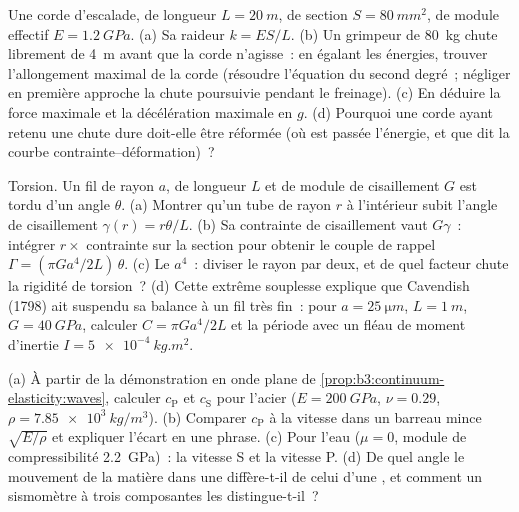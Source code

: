 \begin{exercise}[$\star\star$]\label{exo:b3:continuum-elasticity:7}
Une corde d'escalade, de longueur $L = \qty{20}{m}$, de section $S =
\qty{80}{mm^2}$, de module effectif $E = \qty{1.2}{GPa}$. (a) Sa
raideur $k = ES/L$. (b) Un grimpeur de \qty{80}{kg} chute librement de
\qty{4}{m} avant que la corde n'agisse~: en égalant les énergies,
trouver l'allongement maximal de la corde (résoudre l'équation du
second degré~; négliger en première approche la chute poursuivie
pendant le freinage). (c) En déduire la force maximale et la
décélération maximale en $g$. (d) Pourquoi une corde ayant retenu une
chute dure doit-elle être réformée (où est passée l'énergie, et que dit
la courbe contrainte--déformation)~?
\end{exercise}

\begin{exercise}[$\star\star$]\label{exo:b3:continuum-elasticity:8}
Torsion. Un fil de rayon $a$, de longueur $L$ et de module de
cisaillement $G$ est tordu d'un angle $\theta$. (a) Montrer qu'un tube
de rayon $r$ à l'intérieur subit l'angle de cisaillement
$\gamma(r) = r\theta/L$. (b) Sa contrainte de cisaillement vaut
$G\gamma$~: intégrer $r \times$ contrainte sur la section pour obtenir
le couple de rappel $\Gamma = (\pi Ga^4/2L)\,\theta$. (c) Le $a^4$~:
diviser le rayon par deux, et de quel facteur chute la rigidité de
torsion~? (d) Cette extrême souplesse explique que Cavendish (1798) ait
suspendu sa balance à un fil très fin~: pour $a = \qty{25}{\micro m}$, $L =
\qty{1}{m}$, $G = \qty{40}{GPa}$, calculer $C = \pi Ga^4/2L$ et la
période avec un fléau de moment d'inertie $I = \qty{5e-4}{kg.m^2}$.
\end{exercise}

\begin{exercise}[$\star\star$]\label{exo:b3:continuum-elasticity:9}
(a) À partir de la démonstration en onde plane de
\cref{prop:b3:continuum-elasticity:waves}, calculer $c_{\text{P}}$ et
$c_{\text{S}}$ pour l'acier ($E = \qty{200}{GPa}$, $\nu = 0.29$, $\rho =
\qty{7.85e3}{kg/m^3}$). (b) Comparer $c_{\text{P}}$ à la vitesse dans
un barreau mince $\sqrt{E/\rho}$ et expliquer l'écart en une phrase.
(c) Pour l'eau ($\mu = 0$, module de compressibilité \qty{2.2}{GPa})~:
la vitesse S et la vitesse P. (d) De quel angle le mouvement de la
matière dans une  diffère-t-il de celui d'une , et comment
un sismomètre à trois composantes les distingue-t-il~?
\end{exercise}

